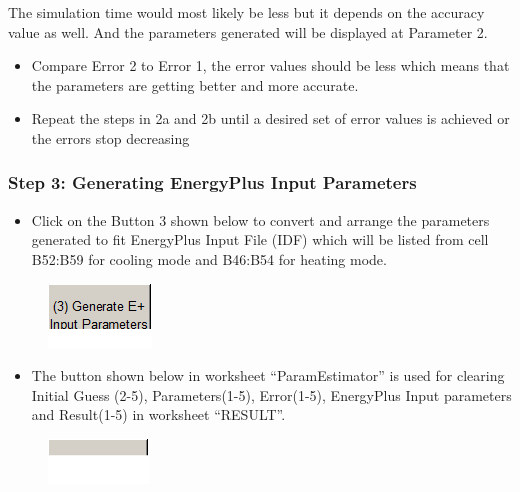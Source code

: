 The simulation time would most likely be less but it depends on the accuracy value as well. And the parameters generated will be displayed at Parameter 2.

\begin{itemize}
\item
  Compare Error 2 to Error 1, the error values should be less which means that the parameters are getting better and more accurate.
\item
  Repeat the steps in 2a and 2b until a desired set of error values is achieved or the errors stop decreasing
\end{itemize}

\subsubsection{Step 3: Generating EnergyPlus Input Parameters}\label{step-3-generating-energyplus-input-parameters-001}

\begin{itemize}
\tightlist
\item
  Click on the Button 3 shown below to convert and arrange the parameters generated to fit EnergyPlus Input File (IDF) which will be listed from cell B52:B59 for cooling mode and B46:B54 for heating mode.
\end{itemize}

\begin{figure}[htbp]
\centering
\includegraphics{media/image042.png}
\caption{}
\end{figure}

\begin{itemize}
\tightlist
\item
  The button shown below in worksheet ``ParamEstimator'' is used for clearing Initial Guess (2-5), Parameters(1-5), Error(1-5), EnergyPlus Input parameters and Result(1-5) in worksheet ``RESULT''.
\end{itemize}

\begin{figure}[htbp]
\centering
\includegraphics{media/image043.png}
\caption{}
\end{figure}

